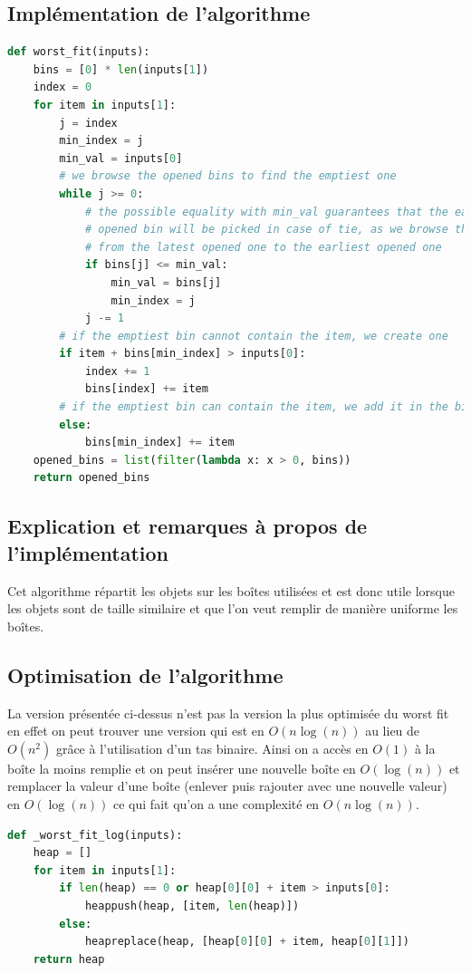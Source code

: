 \documentclass{article}
\begin{document}
\subsection{Implémentation de l'algorithme}
\begin{lstlisting}[language=Python, frame=single]
def worst_fit(inputs):
    bins = [0] * len(inputs[1])
    index = 0
    for item in inputs[1]:
        j = index
        min_index = j
        min_val = inputs[0]
        # we browse the opened bins to find the emptiest one
        while j >= 0:
            # the possible equality with min_val guarantees that the earliest
            # opened bin will be picked in case of tie, as we browse the bins
            # from the latest opened one to the earliest opened one
            if bins[j] <= min_val:
                min_val = bins[j]
                min_index = j
            j -= 1
        # if the emptiest bin cannot contain the item, we create one
        if item + bins[min_index] > inputs[0]:
            index += 1
            bins[index] += item
        # if the emptiest bin can contain the item, we add it in the bin
        else:
            bins[min_index] += item
    opened_bins = list(filter(lambda x: x > 0, bins))
    return opened_bins
\end{lstlisting}

\subsection{Explication et remarques à propos de l'implémentation}
Cet algorithme répartit les objets sur les boîtes utilisées et est donc utile lorsque les objets sont
de taille similaire et que l'on veut remplir de manière uniforme les boîtes.
\subsection{Optimisation de l'algorithme}
La version présentée ci-dessus n'est pas la version la plus optimisée du worst fit
en effet on peut trouver une version qui est en $O(n\log(n))$ au lieu de $O(n^2)$ grâce à l'utilisation
d'un tas binaire.
Ainsi on a accès en $O(1)$ à la boîte la moins remplie et on peut insérer une nouvelle boîte en $O(\log(n))$
et remplacer la valeur d'une boîte (enlever puis rajouter avec une nouvelle valeur) en $O(\log(n))$
ce qui fait qu'on a une complexité en $O(n\log(n))$.
\begin{lstlisting}[language=Python, frame=single]
def _worst_fit_log(inputs):
    heap = []
    for item in inputs[1]:
        if len(heap) == 0 or heap[0][0] + item > inputs[0]:
            heappush(heap, [item, len(heap)])
        else:
            heapreplace(heap, [heap[0][0] + item, heap[0][1]])
    return heap
\end{lstlisting}
\end{document}
